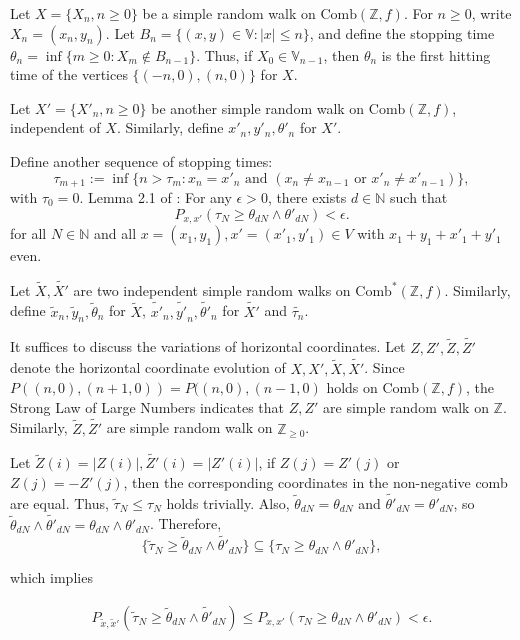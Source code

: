 \documentclass[10pt,twoside]{article}
\begin{document}
Let $X = \{X_n, n \geq 0\}$ be a simple random walk on $\mathrm{Comb}(\mathbb{Z}, f)$. For $n \geq 0$, write $X_n = (x_n, y_n)$. Let $B_n = \{(x, y) \in \mathbb{V} : |x| \leq n\}$, and define the stopping time $\theta_n = \inf\{m \geq 0 : X_m \notin B_{n-1}\}$. Thus, if $X_0 \in \mathbb{V}_{n-1}$, then $\theta_n$ is the first hitting time of the vertices $\{(-n, 0), (n, 0)\}$ for $X$. 

Let $X' = \{X'_n, n \geq 0\}$ be another simple random walk on $\mathrm{Comb}(\mathbb{Z}, f)$, independent of $X$. Similarly, define $x'_n, y'_n, \theta'_n$ for $X'$.

Define another sequence of stopping times:
$$
\tau_{m+1} := \inf\{n > \tau_m : x_n = x'_n \text{ and } (x_n \neq x_{n-1} \text{ or } x'_n \neq x'_{n-1})\},
$$with $\tau_0 = 0$. Lemma 2.1 of \cite{CC2011}: For any $\epsilon > 0$, there exists $d \in \mathbb{N}$ such that
$$
P_{x, x'}(\tau_N \geq \theta_{dN} \wedge \theta'_{dN}) < \epsilon.
$$for all $N \in \mathbb{N}$ and all $x = (x_1, y_1), x' = (x'_1, y'_1) \in V$ with $x_1 + y_1 + x'_1 + y'_1$ even.

Let $\tilde{X}, \tilde{X'}$ are two independent simple random walks on $\mathrm{Comb}^*(\mathbb{Z}, f)$. Similarly, define $\tilde{x}_n, \tilde{y}_n, \tilde{\theta}_n$ for $\tilde{X}$, $\tilde{x'}_n, \tilde{y'}_n, \tilde{\theta'}_n$ for $\tilde{X'}$ and $\tilde{\tau_n}$. 

It suffices to discuss the variations of horizontal coordinates. Let $Z, Z', \tilde{Z}, \tilde{Z'}$ denote the horizontal coordinate evolution of $X, X', \tilde{X}, \tilde{X'}$. Since $P((n,0), (n+1,0))=P((n,0), (n-1,0)$ holds on $\mathrm{Comb}(\mathbb{Z}, f)$, the Strong Law of Large Numbers indicates that $Z, Z'$ are simple random walk on $\mathbb{Z}$. Similarly, $\tilde{Z}, \tilde{Z'}$ are simple random walk on $\mathbb{Z}_{\geq 0}$.

Let $\tilde{Z}(i)= |Z(i)|, \tilde{Z'}(i)= |Z'(i)|$, if $Z(j) = Z'(j)$ or $Z(j) = -Z'(j)$, then the corresponding coordinates in the non-negative comb are equal. Thus, $\tilde{\tau}_N \leq \tau_N$ holds trivially. Also, $\tilde{\theta}_{dN} = \theta_{dN}$ and $\tilde{\theta'}_{dN} = \theta'_{dN}$, so $\tilde{\theta}_{dN} \wedge \tilde{\theta'}_{dN} = \theta_{dN} \wedge \theta'_{dN}$. Therefore,
$$
\{\tilde{\tau}_N \geq \tilde{\theta}_{dN} \wedge \tilde{\theta'}_{dN}\} \subseteq \{\tau_N \geq \theta_{dN} \wedge \theta'_{dN}\},
$$

 
which implies
 

\begin{eqnarray}
P_{\tilde{x}, \tilde{x}'}(\tilde{\tau}_N \geq \tilde{\theta}_{dN} \wedge \tilde{\theta'}_{dN}) \leq P_{x, x'}(\tau_N \geq \theta_{dN} \wedge \theta'_{dN}) < \epsilon.
\end{eqnarray}
\end{document}
